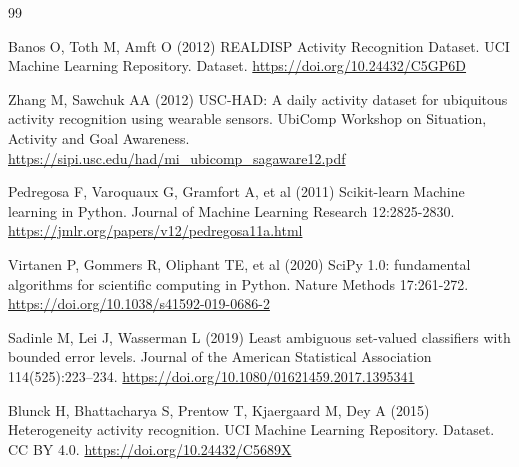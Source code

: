 \documentclass[pdflatex,sn-basic,Numbered,iicol]{sn-jnl}
\begin{document}
\begin{thebibliography}{99}
\begin{minipage}[t]{\linewidth}Banos O, Toth M, Amft O (2012) REALDISP Activity Recognition Dataset. UCI Machine Learning Repository. Dataset. \url{https://doi.org/10.24432/C5GP6D}\end{minipage}

\begin{minipage}[t]{\linewidth}Zhang M, Sawchuk AA (2012) USC-HAD: A daily activity dataset for ubiquitous activity recognition using wearable sensors. UbiComp Workshop on Situation, Activity and Goal Awareness. \url{https://sipi.usc.edu/had/mi_ubicomp_sagaware12.pdf}\end{minipage}

\begin{minipage}[t]{\linewidth}Pedregosa F, Varoquaux G, Gramfort A, et al (2011) Scikit-learn Machine learning in Python. Journal of Machine Learning Research 12:2825-2830. \url{https://jmlr.org/papers/v12/pedregosa11a.html}\end{minipage}

\begin{minipage}[t]{\linewidth}Virtanen P, Gommers R, Oliphant TE, et al (2020) SciPy 1.0: fundamental algorithms for scientific computing in Python. Nature Methods 17:261-272. \url{https://doi.org/10.1038/s41592-019-0686-2}\end{minipage}

\begin{minipage}[t]{\linewidth}Sadinle M, Lei J, Wasserman L (2019) Least ambiguous set-valued classifiers with bounded error levels. Journal of the American Statistical Association 114(525):223--234. \url{https://doi.org/10.1080/01621459.2017.1395341}\end{minipage}

\begin{minipage}[t]{\linewidth}Blunck H, Bhattacharya S, Prentow T, Kjaergaard M, Dey A (2015) Heterogeneity activity recognition. UCI Machine Learning Repository. Dataset. CC BY 4.0. \url{https://doi.org/10.24432/C5689X}\end{minipage}
\end{thebibliography}
\end{document}
